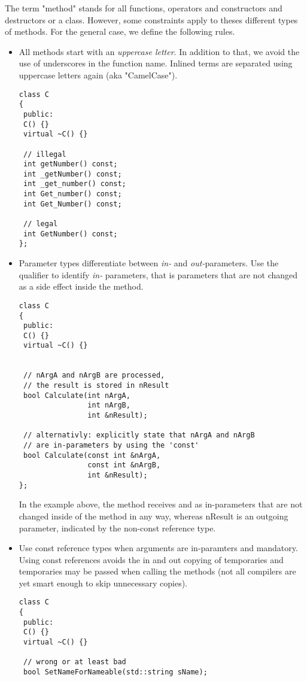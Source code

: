The term "method" stands for all functions, operators and constructors and destructors or a class.
However, some constraints apply to theses different types of methods.
For the general case, we define the following rules.
\begin{itemize}
\item All methods start with an \emph{uppercase letter}. 
In addition to that, we avoid the use of underscores in the function name.
Inlined terms are separated using uppercase letters again (aka "CamelCase").
\begin{verbatim}
class C
{
 public:
 C() {}
 virtual ~C() {}
 
 // illegal
 int getNumber() const;
 int _getNumber() const;
 int _get_number() const;
 int Get_number() const;
 int Get_Number() const;
 
 // legal
 int GetNumber() const;
};
\end{verbatim}
\item Parameter types differentiate between \emph{in-} and \emph{out-}parameters.
Use the  qualifier to identify \emph{in-} parameters, that is parameters that are not changed as a side effect inside the method.
\begin{verbatim}
class C
{
 public:
 C() {}
 virtual ~C() {}
 
 
 // nArgA and nArgB are processed,
 // the result is stored in nResult
 bool Calculate(int nArgA, 
                int nArgB, 
                int &nResult); 

 // alternativly: explicitly state that nArgA and nArgB
 // are in-parameters by using the 'const'
 bool Calculate(const int &nArgA, 
                const int &nArgB, 
                int &nResult);
};
\end{verbatim}
In the example above, the method  receives  and  as in-parameters that are not changed inside of the method in any way, whereas nResult is an outgoing parameter, indicated by the non-const reference type.
\item Use const reference types when arguments are in-paramters and mandatory.
Using const references avoids the in and out copying of temporaries and temporaries may be passed when calling the methods (not all compilers are yet smart enough to skip unnecessary copies).
\begin{verbatim}
class C
{
 public:
 C() {}
 virtual ~C() {}
 
 // wrong or at least bad
 bool SetNameForNameable(std::string sName);
 

\end{verbatim}
\end{itemize}
